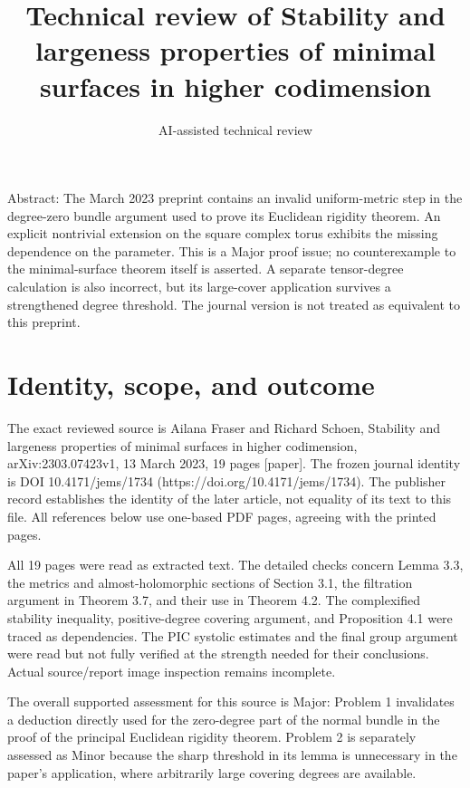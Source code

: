 \documentclass[10pt]{article}
\title{Technical review of Stability and largeness properties of minimal surfaces in higher codimension}
\author{AI-assisted technical review}
\date{}
\begin{document}
\maketitle
Abstract: The March 2023 preprint contains an invalid uniform-metric step in the degree-zero bundle argument used to prove its Euclidean rigidity theorem. An explicit nontrivial extension on the square complex torus exhibits the missing dependence on the parameter. This is a Major proof issue; no counterexample to the minimal-surface theorem itself is asserted. A separate tensor-degree calculation is also incorrect, but its large-cover application survives a strengthened degree threshold. The journal version is not treated as equivalent to this preprint.\par
\section*{Identity, scope, and outcome}
The exact reviewed source is Ailana Fraser and Richard Schoen, Stability and largeness properties of minimal surfaces in higher codimension, arXiv:2303.07423v1, 13 March 2023, 19 pages [paper]. The frozen journal identity is DOI 10.4171/jems/1734 (https://doi.org/10.4171/jems/1734). The publisher record establishes the identity of the later article, not equality of its text to this file. All references below use one-based PDF pages, agreeing with the printed pages.\par
All 19 pages were read as extracted text. The detailed checks concern Lemma 3.3, the metrics and almost-holomorphic sections of Section 3.1, the filtration argument in Theorem 3.7, and their use in Theorem 4.2. The complexified stability inequality, positive-degree covering argument, and Proposition 4.1 were traced as dependencies. The PIC systolic estimates and the final group argument were read but not fully verified at the strength needed for their conclusions. Actual source/report image inspection remains incomplete.\par
The overall supported assessment for this source is Major: Problem 1 invalidates a deduction directly used for the zero-degree part of the normal bundle in the proof of the principal Euclidean rigidity theorem. Problem 2 is separately assessed as Minor because the sharp threshold in its lemma is unnecessary in the paper’s application, where arbitrarily large covering degrees are available.\par
\end{document}

